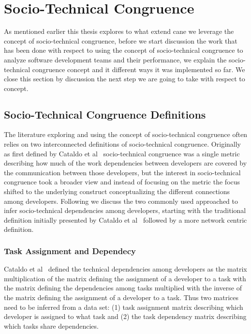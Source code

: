 \section{Socio-Technical Congruence}
As mentioned earlier this thesis explores to what extend cane we leverage the concept of socio-technical congruence, before we start discussion the work that has been done with respect to using the concept of socio-technical congruence to analyze software development teams and their performance, we explain the socio-technical congruence concept and it different ways it was implemented so far.
We close this section by discussion the next step we are going to take with respect to concept.

\subsection{Socio-Technical Congruence Definitions}
The literature exploring and using the concept of socio-technical congruence often relies on two interconnected definitions of socio-technical congruence.
Originally as first defined by Cataldo et al~\cite{cataldo:cscw:2006} socio-technical congruence was a single metric describing how much of the work dependencies between developers are covered by the communication between those developers, but the interest in socio-technical congruence took a broader view and instead of focusing on the metric the focus shifted to the underlying construct conceptualizing the different connections among developers.
Following we discuss the two commonly used approached to infer socio-technical dependencies among developers, starting with the traditional definition initially presented by Cataldo et al~\cite{cataldo:cscw:2006} followed by a more network centric definition.

\subsubsection{Task Assignment and Dependecy}
Cataldo et al~\cite{cataldo:cscw:2006} defined the technical dependencies among developers as the matrix multiplication of the matrix defining the assignment of a developer to a task with the matrix defining the dependencies among tasks multiplied with the inverse of the matrix defining the assignment of a developer to a task.
Thus two matrices need to be inferred from a data set: (1) task assignment matrix describing which developer is assigned to what task and (2) the task dependency matrix describing which tasks share dependencies.

